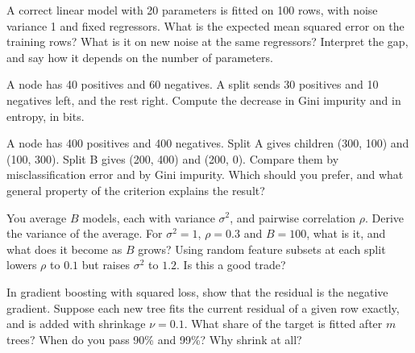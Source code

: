 \begin{question}\label{iq:iv1:machine-learning:11}
A correct linear model with 20 parameters is fitted on 100 rows, with noise variance 1 and fixed regressors. What is the expected mean squared error on the training rows? What is it on new noise at the same regressors? Interpret the gap, and say how it depends on the number of parameters.
\end{question}

\begin{question}\label{iq:iv1:machine-learning:12}
A node has 40 positives and 60 negatives. A split sends 30 positives and 10 negatives left, and the rest right. Compute the decrease in Gini impurity and in entropy, in bits.
\end{question}

\begin{question}\label{iq:iv1:machine-learning:13}
A node has 400 positives and 400 negatives. Split A gives children (300, 100) and (100, 300). Split B gives (200, 400) and (200, 0). Compare them by misclassification error and by Gini impurity. Which should you prefer, and what general property of the criterion explains the result?
\end{question}

\begin{question}\label{iq:iv1:machine-learning:14}
You average $B$ models, each with variance $\sigma^2$, and pairwise correlation $\rho$. Derive the variance of the average. For $\sigma^2 = 1$, $\rho = 0.3$ and $B = 100$, what is it, and what does it become as $B$ grows? Using random feature subsets at each split lowers $\rho$ to $0.1$ but raises $\sigma^2$ to $1.2$. Is this a good trade?
\end{question}

\begin{question}\label{iq:iv1:machine-learning:15}
In gradient boosting with squared loss, show that the residual is the negative gradient. Suppose each new tree fits the current residual of a given row exactly, and is added with shrinkage $\nu = 0.1$. What share of the target is fitted after $m$ trees? When do you pass 90\% and 99\%? Why shrink at all?
\end{question}

